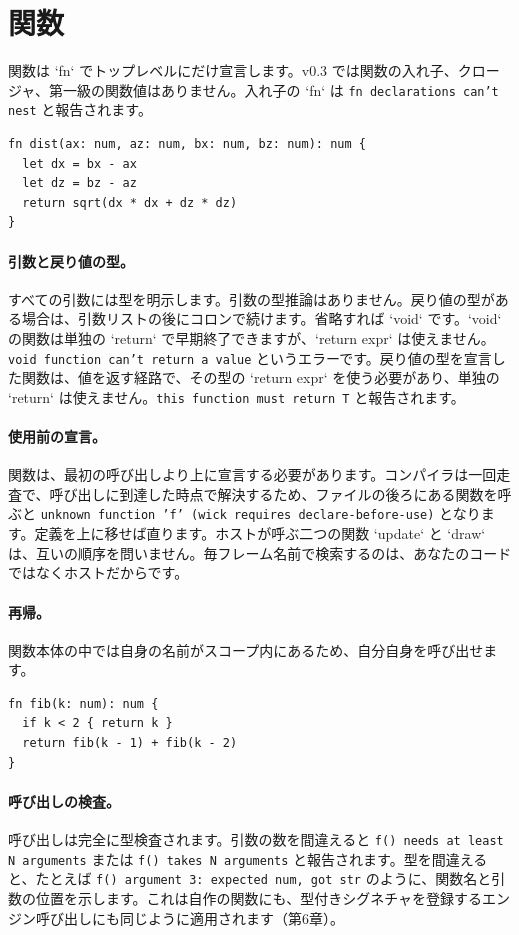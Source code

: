 \section{関数}

関数は `fn` でトップレベルにだけ宣言します。v0.3 では関数の入れ子、クロージャ、第一級の関数値はありません。入れ子の `fn` は \texttt{fn declarations can't nest} と報告されます。

\begin{lstlisting}[language=wick]
fn dist(ax: num, az: num, bx: num, bz: num): num {
  let dx = bx - ax
  let dz = bz - az
  return sqrt(dx * dx + dz * dz)
}
\end{lstlisting}

\paragraph{引数と戻り値の型。} すべての引数には型を明示します。引数の型推論はありません。戻り値の型がある場合は、引数リストの後にコロンで続けます。省略すれば `void` です。`void` の関数は単独の `return` で早期終了できますが、`return expr` は使えません。\texttt{void function can't return a value} というエラーです。戻り値の型を宣言した関数は、値を返す経路で、その型の `return expr` を使う必要があり、単独の `return` は使えません。\texttt{this function must return T} と報告されます。

\paragraph{使用前の宣言。} 関数は、最初の呼び出しより上に宣言する必要があります。コンパイラは一回走査で、呼び出しに到達した時点で解決するため、ファイルの後ろにある関数を呼ぶと \texttt{unknown function 'f' (wick requires declare-before-use)} となります。定義を上に移せば直ります。ホストが呼ぶ二つの関数 `update` と `draw` は、互いの順序を問いません。毎フレーム名前で検索するのは、あなたのコードではなくホストだからです。

\paragraph{再帰。} 関数本体の中では自身の名前がスコープ内にあるため、自分自身を呼び出せます。

\begin{lstlisting}[language=wick]
fn fib(k: num): num {
  if k < 2 { return k }
  return fib(k - 1) + fib(k - 2)
}
\end{lstlisting}

\paragraph{呼び出しの検査。} 呼び出しは完全に型検査されます。引数の数を間違えると \texttt{f() needs at least N arguments} または \texttt{f() takes N arguments} と報告されます。型を間違えると、たとえば \texttt{f() argument 3: expected num, got str} のように、関数名と引数の位置を示します。これは自作の関数にも、型付きシグネチャを登録するエンジン呼び出しにも同じように適用されます（第6章）。

